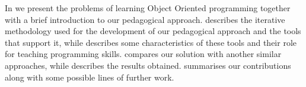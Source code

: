 \smallskip
In  we present the problems of learning Object Oriented programming
together with a brief introduction to our pedagogical approach. 
 describes the iterative methodology 
used for the development of our pedagogical approach 
and the tools that support it,
while  describes some characteristics of these tools
and their role for teaching programming skills.
 compares our solution with another similar approaches, while
 describes the results obtained.
 summarises our contributions
along with some possible lines of further work.


